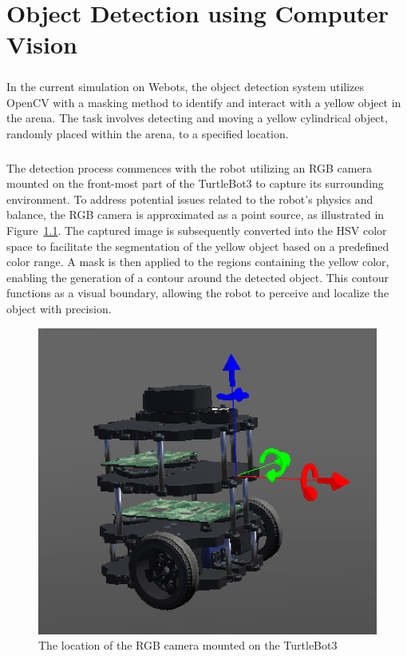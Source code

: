 \chapter{Object Detection using Computer Vision}

\paragraph*{}
In the current simulation on Webots, the object detection system utilizes OpenCV with a masking method to identify and interact with a yellow object in the arena. The task involves detecting and moving a yellow cylindrical object, randomly placed within the arena, to a specified location.

\paragraph*{}
The detection process commences with the robot utilizing an RGB camera mounted on the front-most part of the TurtleBot3 to capture its surrounding environment. To address potential issues related to the robot's physics and balance, the RGB camera is approximated as a point source, as illustrated in Figure~\ref{fig:object detection figure 1}. The captured image is subsequently converted into the HSV color space to facilitate the segmentation of the yellow object based on a predefined color range. A mask is then applied to the regions containing the yellow color, enabling the generation of a contour around the detected object. This contour functions as a visual boundary, allowing the robot to perceive and localize the object with precision.

\begin{figure}[H]
    \centering
    \includegraphics[width=0.5\linewidth]{assets/images/object_detection/fig1.png}
    \caption{The location of the RGB camera mounted on the TurtleBot3}
    \label{fig:object detection figure 1} 
\end{figure}


